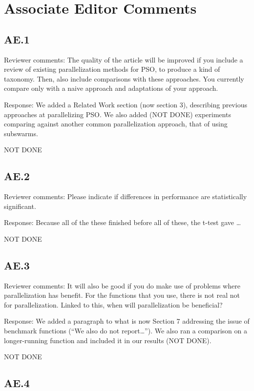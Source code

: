 \documentclass[onecolumn, 12pt]{article}
\begin{document}
\section*{Associate Editor Comments}

\subsection*{AE.1}

Reviewer comments: The quality of the article will be improved if you include a
review of existing parallelization methods for PSO, to produce a kind of
taxonomy. Then, also include comparisons with these approaches. You currently
compare only with a naive approach and adaptations of your approach.

Response: We added a Related Work section (now section 3), describing previous
approaches at parallelizing PSO.  We also added (NOT DONE) experiments
comparing against another common parallelization approach, that of using
subswarms.

NOT DONE

\subsection*{AE.2}

Reviewer comments: Please indicate if differences in performance are
statistically significant.

Response: Because all of the these finished before all of these, the t-test
gave \ldots

NOT DONE

\subsection*{AE.3}

Reviewer comments: It will also be good if you do make use of problems where
parallelization has benefit. For the functions that you use, there is not real
not for parallelization. Linked to this, when will parallelization be
beneficial?

Response: We added a paragraph to what is now Section 7 addressing the issue of
benchmark functions (``We also do not report\ldots'').  We also ran a
comparison on a longer-running function and included it in our results (NOT
DONE).

NOT DONE

\subsection*{AE.4}
\end{document}
